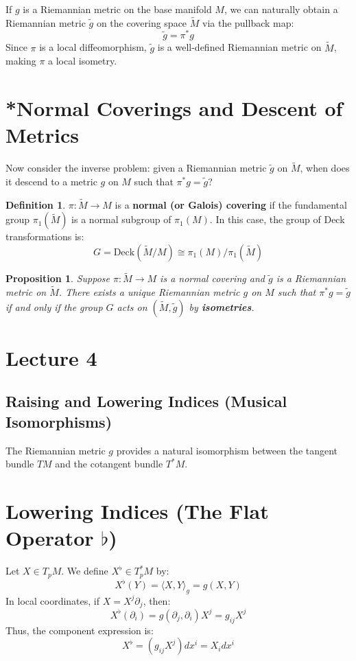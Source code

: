 \documentclass[11pt, a4paper]{article}
\theoremstyle{plain}
\newtheorem{proposition}[theorem]{Proposition}
\theoremstyle{definition}
\newtheorem{definition}[theorem]{Definition}
\theoremstyle{remark}
\begin{document}
If $g$ is a Riemannian metric on the base manifold $M$, we can naturally obtain a Riemannian metric $\tilde{g}$ on the covering space $\tilde{M}$ via the pullback map:
\[
\tilde{g} = \pi^* g
\]
Since $\pi$ is a local diffeomorphism, $\tilde{g}$ is a well-defined Riemannian metric on $\tilde{M}$, making $\pi$ a local isometry.

\section*{*Normal Coverings and Descent of Metrics}

Now consider the inverse problem: given a Riemannian metric $\tilde{g}$ on $\tilde{M}$, when does it descend to a metric $g$ on $M$ such that $\pi^* g = \tilde{g}$?

\begin{definition}
$\pi: \tilde{M} \to M$ is a \textbf{normal (or Galois) covering} if the fundamental group $\pi_1(\tilde{M})$ is a normal subgroup of $\pi_1(M)$. In this case, the group of Deck transformations is:
\[
G = \text{Deck}(\tilde{M}/M) \cong \pi_1(M) / \pi_1(\tilde{M})
\]
\end{definition}

\begin{proposition}
Suppose $\pi: \tilde{M} \to M$ is a normal covering and $\tilde{g}$ is a Riemannian metric on $\tilde{M}$. There exists a unique Riemannian metric $g$ on $M$ such that $\pi^* g = \tilde{g}$ if and only if the group $G$ acts on $(\tilde{M}, \tilde{g})$ by \textbf{isometries}.
\end{proposition}

\newpage

\section{Lecture 4}

\subsection{Raising and Lowering Indices (Musical Isomorphisms)}

The Riemannian metric $g$ provides a natural isomorphism between the tangent bundle $TM$ and the cotangent bundle $T^*M$.

\section*{Lowering Indices (The Flat Operator $\flat$)}
Let $X \in T_p M$. We define $X^\flat \in T_p^* M$ by:
\[ X^\flat(Y) = \langle X, Y \rangle_g = g(X, Y) \]
In local coordinates, if $X = X^j \partial_j$, then:
\[ X^\flat(\partial_i) = g(\partial_j, \partial_i) X^j = g_{ij} X^j \]
Thus, the component expression is:
\[ X^\flat = (g_{ij} X^j) dx^i = X_i dx^i \]
\end{document}
